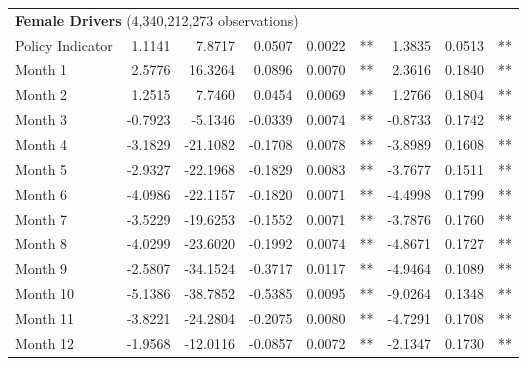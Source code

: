\begin{table}
\begin{tabular}{l r r r r l r r l}
\hline 

\multicolumn{7}{l}{\textbf{Female Drivers} (4,340,212,273 observations)} \\ 

Policy Indicator          &  1.1141        &  7.8717       &  0.0507        &  0.0022       &   **       &  1.3835        &  0.0513       &   **       \\ 
Month 1                         &  2.5776        &  16.3264       &  0.0896        &  0.0070       &   **       &  2.3616        &  0.1840       &   **       \\ 
Month 2                         &  1.2515        &  7.7460       &  0.0454        &  0.0069       &   **       &  1.2766        &  0.1804       &   **       \\ 
Month 3                         &  -0.7923        &  -5.1346       &  -0.0339        &  0.0074       &   **       &  -0.8733        &  0.1742       &   **       \\ 
Month 4                         &  -3.1829        &  -21.1082       &  -0.1708        &  0.0078       &   **       &  -3.8989        &  0.1608       &   **       \\ 
Month 5                         &  -2.9327        &  -22.1968       &  -0.1829        &  0.0083       &   **       &  -3.7677        &  0.1511       &   **       \\ 
Month 6                         &  -4.0986        &  -22.1157       &  -0.1820        &  0.0071       &   **       &  -4.4998        &  0.1799       &   **       \\ 
Month 7                         &  -3.5229        &  -19.6253       &  -0.1552        &  0.0071       &   **       &  -3.7876        &  0.1760       &   **       \\ 
Month 8                         &  -4.0299        &  -23.6020       &  -0.1992        &  0.0074       &   **       &  -4.8671        &  0.1727       &   **       \\ 
Month 9                         &  -2.5807        &  -34.1524       &  -0.3717        &  0.0117       &   **       &  -4.9464        &  0.1089       &   **       \\ 
Month 10                        &  -5.1386        &  -38.7852       &  -0.5385        &  0.0095       &   **       &  -9.0264        &  0.1348       &   **       \\ 
Month 11                        &  -3.8221        &  -24.2804       &  -0.2075        &  0.0080       &   **       &  -4.7291        &  0.1708       &   **       \\ 
Month 12                        &  -1.9568        &  -12.0116       &  -0.0857        &  0.0072       &   **       &  -2.1347        &  0.1730       &   **       \\ 


\end{tabular}
\end{table}
